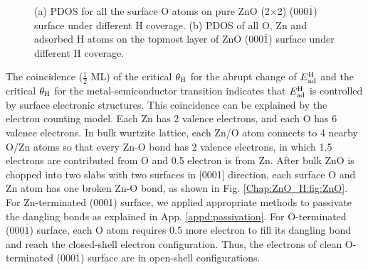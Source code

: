 \begingroup
\begin{figure}[!ht]
  \centering
  \label{Chap:ZnO_H:fig:DOSO}
  \label{Chap:ZnO_H:fig:DOSall}
  \caption[\ac{PDOS} for all the surface O atoms on pure ZnO (2$\times$2) (000$\overline{1}$) surface under different H coverage]{(a) \ac{PDOS} for all the surface O atoms on pure ZnO (2$\times$2) (000$\overline{1}$) surface under different H coverage. (b) \ac{PDOS} of all O, Zn and adsorbed H atoms on the topmost layer of ZnO (000$\overline{1}$) surface under different H coverage.}
  \label{Chap:ZnO_H:fig:DOS}
\end{figure}
\endgroup

The coincidence ($\frac{1}{2}$ \ac{ML}) of the critical $\theta_{\textup{H}}$ for the abrupt change of $E_{\textup{ad}}^{\textup{H}}$ and the critical $\theta_{\textup{H}}$ for the metal-semiconductor transition indicates that $E_{\textup{ad}}^{\textup{H}}$ is controlled by surface electronic structures. This coincidence can be explained by the electron counting model\cite{pashley1989electron}. Each Zn has 2 valence electrons, and each O has 6 valence electrons. In bulk wurtzite lattice, each Zn/O atom connects to 4 nearby O/Zn atoms so that every Zn-O bond has 2 valence electrons, in which 1.5 electrons are contributed from O and 0.5 electron is from Zn. After bulk ZnO is chopped into two slabs with two surfaces in [0001] direction, each surface O and Zn atom has one broken Zn-O bond, as shown in Fig. \ref{Chap:ZnO_H:fig:ZnO}. For Zn-terminated (0001) surface, we applied appropriate methods to passivate the dangling bonds as explained in App. \ref{appd:passivation}. For O-terminated (000$\overline{1}$) surface, each O atom requires 0.5 more electron to fill its dangling bond and reach the closed-shell electron configuration. Thus, the electrons of clean O-terminated (000$\overline{1}$) surface are in open-shell configurations. 

